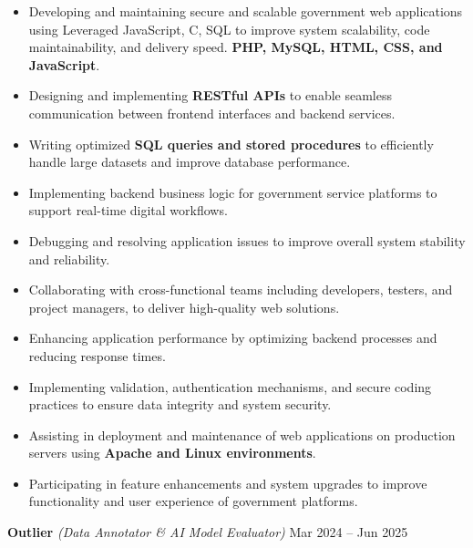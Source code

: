 \documentclass[a4paper,10.9pt]{article}
\begin{document}
\begin{itemize}

\item Developing and maintaining secure and scalable government web applications using Leveraged JavaScript, C, SQL to improve system scalability, code maintainability, and delivery speed. \textbf{PHP, MySQL, HTML, CSS, and JavaScript}.

\item Designing and implementing \textbf{RESTful APIs} to enable seamless communication between frontend interfaces and backend services.

\item Writing optimized \textbf{SQL queries and stored procedures} to efficiently handle large datasets and improve database performance.

\item Implementing backend business logic for government service platforms to support real-time digital workflows.

\item Debugging and resolving application issues to improve overall system stability and reliability.

\item Collaborating with cross-functional teams including developers, testers, and project managers, to deliver high-quality web solutions.

\item Enhancing application performance by optimizing backend processes and reducing response times.

\item Implementing validation, authentication mechanisms, and secure coding practices to ensure data integrity and system security.

\item Assisting in deployment and maintenance of web applications on production servers using \textbf{Apache and Linux environments}.

\item Participating in feature enhancements and system upgrades to improve functionality and user experience of government platforms.


\end{itemize}

\vspace{3pt}

{\large\textbf{\color{hdrblue}Outlier}}
\textit{(Data Annotator \& AI Model Evaluator)} \hfill Mar 2024 -- Jun 2025
\end{document}
